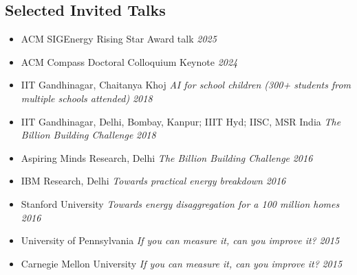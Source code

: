 \documentclass[letter,10pt]{article}
\begin{document}
\begin{itemize}

\end{itemize}


\subsection*{\textbf{Selected Invited Talks}}
\vspace{-0.4em}

\begin{itemize}
      \item[] {ACM SIGEnergy Rising Star Award talk} \hfill \textit{2025}
      \item[] {ACM Compass Doctoral Colloquium Keynote} \hfill \textit{2024}
      \item[] {IIT Gandhinagar, Chaitanya Khoj}
	 \textit{AI for school children (300+ students from multiple schools attended)} \hfill \textit{2018}
      \item[] {IIT Gandhinagar, Delhi, Bombay, Kanpur; IIIT Hyd; IISC, MSR India}
	 \textit{The Billion Building Challenge} \hfill \textit{2018}
     \item[] {Aspiring Minds Research, Delhi}
	 \textit{The Billion Building Challenge} \hfill \textit{2016}
    \item[] {IBM Research, Delhi}
	 \textit{Towards practical energy breakdown} \hfill \textit{2016}
	
	\item[] {Stanford University}
	\textit{Towards energy disaggregation for a 100 million homes} \hfill \textit{2016}
	\item[] {University of Pennsylvania}
	\textit{If you can measure it, can you improve it?} \hfill \textit{2015}
	\item[] {Carnegie Mellon University}
	\textit{If you can measure it, can you improve it?} \hfill \textit{2015}
	
\end{itemize}
\end{document}
